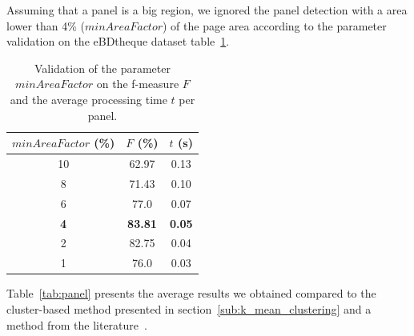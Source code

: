 Assuming that a panel is a big region, we ignored the panel detection with a area lower than 4\% ($minAreaFactor$) of the page area according to the parameter validation on the eBDtheque dataset table~\ref{tab:minAreaFactor_validation}.


  \begin{table}[ht]
    \centering
    \caption{Validation of the parameter $minAreaFactor$ on the f-measure $F$ and the average processing time $t$ per panel.}
    \begin{tabular}{|c|c|c|}
		\hline
		$minAreaFactor$ (\%) & $F$ (\%) 	&$t$ (s)\\
		\hline 
		10 & 62.97 & 0.13 \\
		\hline
		8 & 71.43 & 0.10 \\
		\hline
		6 & 77.0 & 0.07	\\
		\hline
		\textbf{4} & \textbf{83.81} & \textbf{0.05} \\
		\hline
		2 & 82.75 & 0.04 \\
		\hline
		1 & 76.0 & 0.03 \\
		\hline

	\end{tabular}
    \label{tab:minAreaFactor_validation}
  \end{table}%



Table~\ref{tab:panel} presents the average results we obtained compared to the cluster-based method presented in section~\ref{sub:k_mean_clustering} and a method from the literature~\cite{Arai11}.

